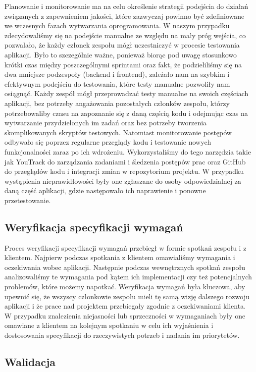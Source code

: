 Planowanie i monitorowanie ma na celu określenie strategii podejścia do działań związanych z zapewnieniem jakości, które zazwyczaj powinno być zdefiniowane we wczesnych fazach wytwarzania oprogramowania. W naszym przypadku zdecydowaliśmy się na podejście manualne ze względu na mały próg wejścia, co pozwalało, że każdy członek zespołu mógł uczestniczyć w procesie testowania aplikacji. Było to szczególnie ważne, ponieważ biorąc pod uwagę stosunkowo krótki czas między poszczególnymi sprintami oraz fakt, że podzieliliśmy się na dwa mniejsze podzespoły (backend i frontend), zależało nam na szybkim i efektywnym podejściu do testowania, które testy manualne pozwoliły nam osiągnąć. Każdy zespół mógł przeprowadzać testy manualne na swoich częściach aplikacji, bez potrzeby angażowania pozostałych członków zespołu, którzy potrzebowaliby czasu na zapoznanie się z daną częścią kodu i odejmując czas na wytwarzanie przydzielonych im zadań oraz bez potrzeby tworzenia skomplikowanych skryptów testowych. Natomiast monitorowanie postępów odbywało się poprzez regularne przeglądy kodu i testowanie nowych funkcjonalności zaraz po ich wdrożeniu. Wykorzystaliśmy do tego narzędzia takie jak YouTrack do zarządzania zadaniami i śledzenia postępów prac oraz GitHub do przeglądów kodu i integracji zmian w repozytorium projektu. W przypadku wystąpienia nieprawidłowości były one zgłaszane do osoby odpowiedzialnej za daną część aplikacji, gdzie następowało ich naprawienie i ponowne przetestowanie.

\subsection{Weryfikacja specyfikacji wymagań}

Proces weryfikacji specyfikacji wymagań przebiegł w formie spotkań zespołu i z klientem. Najpierw podczas spotkania z klientem omawialiśmy wymagania i oczekiwania wobec aplikacji. Następnie podczas wewnętrznych spotkań zespołu analizowaliśmy te wymagania pod kątem ich implementacji czy też potencjalnych problemów, które możemy napotkać. Weryfikacja wymagań była kluczowa, aby upewnić się, że wszyscy członkowie zespołu mieli tę samą wizję dalszego rozwoju aplikacji i że prace nad projektem przebiegały zgodnie z oczekiwaniami klienta. W przypadku znalezienia niejasności lub sprzeczności w wymaganiach były one omawiane z klientem na kolejnym spotkaniu w celu ich wyjaśnienia i dostosowania specyfikacji do rzeczywistych potrzeb i nadania im priorytetów.

\subsection{Walidacja}

